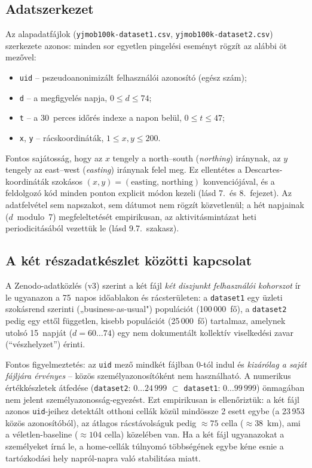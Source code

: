 \subsection{Adatszerkezet}

Az alapadatfájlok (\texttt{yjmob100k-dataset1.csv}, \texttt{yjmob100k-dataset2.csv}) szerkezete azonos: minden sor egyetlen pingelési eseményt rögzít az alábbi öt mezővel:

\begin{itemize}
    \item \texttt{uid} -- pszeudoanonimizált felhasználói azonosító (egész szám);
    \item \texttt{d} -- a megfigyelés napja, $0 \le d \le 74$;
    \item \texttt{t} -- a 30~perces időrés indexe a napon belül, $0 \le t \le 47$;
    \item \texttt{x}, \texttt{y} -- rácskoordináták, $1 \le x, y \le 200$.
\end{itemize}

Fontos sajátosság, hogy az $x$ tengely a north--south (\textit{northing}) iránynak, az $y$ tengely az east--west (\textit{easting}) iránynak felel meg. Ez ellentétes a Descartes-koordináták szokásos $(x, y) = (\text{easting, northing})$ konvenciójával, és a feldolgozó kód minden ponton explicit módon kezeli (lásd 7.\ és 8.\ fejezet). Az adatfelvétel sem napszakot, sem dátumot nem rögzít közvetlenül; a hét napjainak ($d$~modulo~7) megfeleltetését empirikusan, az aktivitásmintázat heti periodicitásából vezettük le (lásd 9.7.\ szakasz).

\subsection{A két részadatkészlet közötti kapcsolat}
\label{subsec:two_datasets}

A Zenodo-adatközlés (v3) szerint a két fájl \emph{két diszjunkt felhasználói kohorszot} ír le ugyanazon a 75~napos időablakon és rácsterületen: a \texttt{dataset1} egy üzleti szokásrend szerinti („business-as-usual") populációt (100\,000~fő), a \texttt{dataset2} pedig egy ettől független, kisebb populációt (25\,000~fő) tartalmaz, amelynek utolsó 15~napját (\(d=60\ldots74\)) egy nem dokumentált kollektív viselkedési zavar (\enquote{vészhelyzet}) érinti.

Fontos figyelmeztetés: az \texttt{uid} mező mindkét fájlban 0-tól indul és \emph{kizárólag a saját fájljára érvényes} -- közös személyazonosítóként nem használható. A numerikus értékkészletek átfedése (\texttt{dataset2}: $0\ldots24\,999$ \(\subset\) \texttt{dataset1}: $0\ldots99\,999$) önmagában nem jelent személyazonosság-egyezést. Ezt empirikusan is ellenőriztük: a két fájl azonos \texttt{uid}-jeihez detektált otthoni cellák közül mindössze 2 esett egybe (a 23\,953 közös azonosítóból), az átlagos rácstávolságuk pedig $\approx 75$ cella ($\approx 38$~km), ami a véletlen-baseline ($\approx 104$ cella) közelében van. Ha a két fájl ugyanazokat a személyeket írná le, a home-cellák túlnyomó többségének egybe kéne esnie a tartózkodási hely napról-napra való stabilitása miatt.

